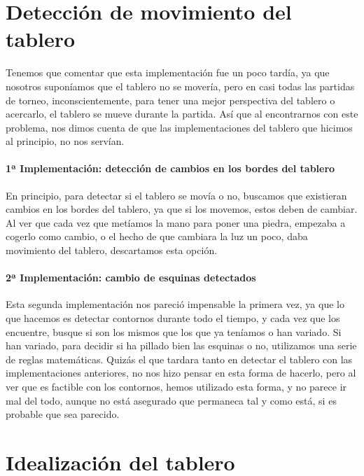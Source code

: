 \documentclass[12pt,a4paper]{report}
\begin{document}



\section{Detección de movimiento del tablero}

Tenemos que comentar que esta implementación fue un poco tardía, ya que nosotros
suponíamos que el tablero no se movería, pero en casi todas las partidas de
torneo, inconscientemente, para tener una mejor perspectiva del tablero o
acercarlo, el tablero se mueve durante la partida. Así que al encontrarnos con
este problema, nos dimos cuenta de que las implementaciones del tablero que
hicimos al principio, no nos servían. 

\paragraph{1ª Implementación: detección de cambios en los bordes del tablero}

En principio, para detectar si el tablero se movía o no, buscamos que existieran
cambios en los bordes del tablero, ya que si los movemos, estos deben de
cambiar. Al ver que cada vez que metíamos la mano para poner una piedra,
empezaba a cogerlo como cambio, o el hecho de que cambiara la luz un poco, daba
movimiento del tablero, descartamos esta opción. 

\paragraph{2ª Implementación: cambio de esquinas detectados} 

Esta segunda implementación nos pareció impensable la primera vez, ya que lo que
hacemos es detectar contornos durante todo el tiempo, y cada vez que los
encuentre, busque si son los mismos que los que ya teníamos o han variado. Si
han variado, para decidir si ha pillado bien las esquinas o no, utilizamos una
serie de reglas matemáticas. 
Quizás el que tardara tanto en detectar el tablero con las implementaciones
anteriores, no nos hizo pensar en esta forma de hacerlo, pero al ver que es
factible con los contornos, hemos utilizado esta forma, y no parece ir mal del
todo, aunque no está asegurado que permaneca tal y como está, si es probable que
sea parecido. 



\section{Idealización del tablero} 
\end{document}
